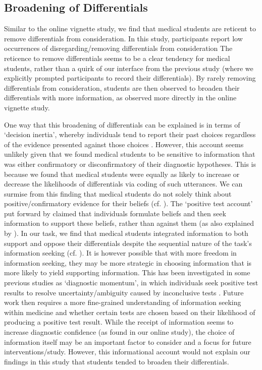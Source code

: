 \documentclass[a4paper, nobind]{templates/ociamthesis}
\begin{document}
\subsection*{Broadening of Differentials}\label{broadening-of-differentials-1}

Similar to the online vignette study, we find that medical students are reticent to remove differentials from consideration. In this study, participants report low occurrences of disregarding/removing differentials from consideration The reticence to remove differentials seems to be a clear tendency for medical students, rather than a quirk of our interface from the previous study (where we explicitly prompted participants to record their differentials). By rarely removing differentials from consideration, students are then observed to broaden their differentials with more information, as observed more directly in the online vignette study.

One way that this broadening of differentials can be explained is in terms of `decision inertia', whereby individuals tend to report their past choices regardless of the evidence presented against those choices \autocite{akaishi_autonomous_2014}. However, this account seems unlikely given that we found medical students to be sensitive to information that was either confirmatory or disconfirmatory of their diagnostic hypotheses. This is because we found that medical students were equally as likely to increase or decrease the likelihoods of differentials via coding of such utterances. We can surmise from this finding that medical students do not solely think about positive/confirmatory evidence for their beliefs (cf. \textcite{kaanders_humans_2022}). The `positive test account' put forward by \autocite{klayman_confirmation_1987} claimed that individuals formulate beliefs and then seek information to support these beliefs, rather than against them (as also explained by \textcite{hunt_approach-induced_2016}). In our task, we find that medical students integrated information to both support and oppose their differentials despite the sequential nature of the task's information seeking (cf. \textcite{jonas_confirmation_2001}). It is however possible that with more freedom in information seeking, they may be more strategic in choosing information that is more likely to yield supporting information. This has been investigated in some previous studies as `diagnostic momentum', in which individuals seek positive test results to resolve uncertainty/ambiguity caused by inconclusive tests \autocite{aron_diagnostic_2024}. Future work then requires a more fine-grained understanding of information seeking within medicine and whether certain tests are chosen based on their likelihood of producing a positive test result. While the receipt of information seems to increase diagnostic confidence (as found in our online study), the choice of information itself may be an important factor to consider and a focus for future interventions/study. However, this informational account would not explain our findings in this study that students tended to broaden their differentials.
\end{document}
